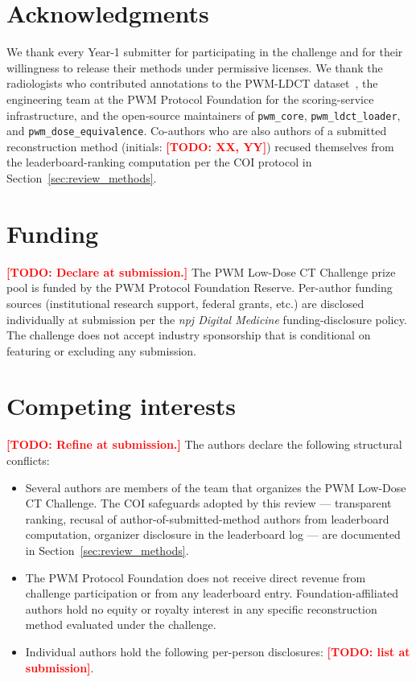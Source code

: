 \documentclass[twoside,11pt]{article}
\newcommand{\todo}[1]{\textcolor{red}{\textbf{[TODO: #1]}}}
\begin{document}
\section*{Acknowledgments}

We thank every Year-1 submitter for participating in the challenge and for their willingness to release their methods under permissive licenses. We thank the radiologists who contributed annotations to the PWM-LDCT dataset~\citep{ws1dataset}, the engineering team at the PWM Protocol Foundation for the scoring-service infrastructure, and the open-source maintainers of \texttt{pwm\_core}, \texttt{pwm\_ldct\_loader}, and \texttt{pwm\_dose\_equivalence}. Co-authors who are also authors of a submitted reconstruction method (initials: \todo{XX, YY}) recused themselves from the leaderboard-ranking computation per the COI protocol in Section~\ref{sec:review_methods}.

\section*{Funding}

\todo{Declare at submission.} The PWM Low-Dose CT Challenge prize pool is funded by the PWM Protocol Foundation Reserve. Per-author funding sources (institutional research support, federal grants, etc.) are disclosed individually at submission per the \emph{npj Digital Medicine} funding-disclosure policy. The challenge does not accept industry sponsorship that is conditional on featuring or excluding any submission.

\section*{Competing interests}

\todo{Refine at submission.} The authors declare the following structural conflicts:

\begin{itemize}
    \item Several authors are members of the team that organizes the PWM Low-Dose CT Challenge. The COI safeguards adopted by this review --- transparent ranking, recusal of author-of-submitted-method authors from leaderboard computation, organizer disclosure in the leaderboard log --- are documented in Section~\ref{sec:review_methods}.
    \item The PWM Protocol Foundation does not receive direct revenue from challenge participation or from any leaderboard entry. Foundation-affiliated authors hold no equity or royalty interest in any specific reconstruction method evaluated under the challenge.
    \item Individual authors hold the following per-person disclosures: \todo{list at submission}.
\end{itemize}
\end{document}
